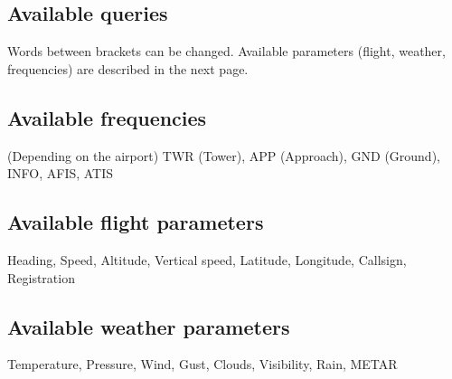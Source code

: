 \documentclass[12pt,oneside,a4]{article}
\begin{document}
\newpage
\begin{landscape}
\thispagestyle{empty}
\section*{Available queries}
\label{sec:available-queries}

Words between brackets can be changed. 
Available parameters (flight, weather, frequencies) are described in the next page.




\newpage
\thispagestyle{empty}

\subsection*{Available frequencies} 
(Depending on the airport) TWR (Tower), APP (Approach), GND (Ground), INFO, AFIS, ATIS

\subsection*{Available flight parameters} 
Heading, Speed, Altitude, Vertical speed, Latitude, Longitude, Callsign, Registration

\subsection*{Available weather parameters}
Temperature, Pressure, Wind, Gust, Clouds, Visibility, Rain, METAR


\end{landscape}
\end{document}
